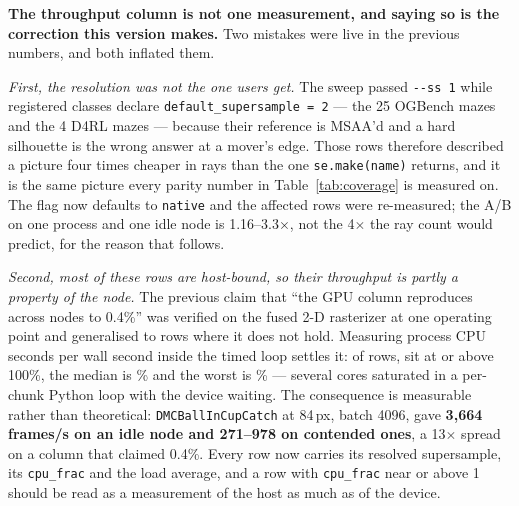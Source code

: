 \documentclass{article}
\begin{document}
\textbf{The throughput column is not one measurement, and saying so is the
correction this version makes.} Two mistakes were live in the previous
numbers, and both inflated them.

\emph{First, the resolution was not the one users get.} The sweep passed
\texttt{-{-}ss~1} while \seNssTwo{} registered classes declare
\texttt{default\_supersample = 2} --- the 25 OGBench mazes and the 4 D4RL
mazes --- because their
reference is MSAA'd and a hard silhouette is the wrong answer at a mover's
edge. Those rows
therefore described a picture four times cheaper in rays than the one
\texttt{se.make(name)} returns, and it is the same picture every parity number
in Table~\ref{tab:coverage} is measured on. The flag now defaults to
\texttt{native} and the affected rows were re-measured; the A/B on one process
and one idle node is 1.16--3.3$\times$, not the 4$\times$ the ray count would
predict, for the reason that follows.

\emph{Second, most of these rows are host-bound, so their throughput is partly
a property of the node.} The previous claim that ``the GPU column reproduces
across nodes to 0.4\%'' was verified on the fused 2-D rasterizer at one
operating point and generalised to rows where it does not hold. Measuring
process CPU seconds per wall second inside the timed loop settles it: of
\seNhostRows{} rows, \seNhostAbove{} sit at or above 100\%, the median is
\seHostMedian\% and the worst is \seHostMax\% --- several cores saturated in a
per-chunk Python loop with the device waiting. The consequence is measurable
rather than theoretical: \texttt{DMCBallInCupCatch} at 84\,px, batch 4096,
gave \textbf{3,664 frames/s on an idle node and 271--978 on contended ones}, a
13$\times$ spread on a column that claimed 0.4\%. Every row now carries its
resolved supersample, its \texttt{cpu\_frac} and the load average, and a row
with \texttt{cpu\_frac} near or above 1 should be read as a measurement of the
host as much as of the device.
\end{document}
